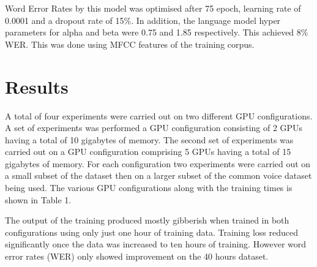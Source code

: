 Word Error Rates by this model was optimised after 75 epoch, learning rate of 0.0001 and a dropout rate of 15\%.  In addition, the language model hyper parameters for alpha and beta were 0.75 and 1.85 respectively.  This achieved 8\% WER. This was done using MFCC features of the training corpus.


\section{Results}
A total of four experiments were carried out on two different GPU configurations. A set of experiments was performed a GPU configuration consisting of 2 GPUs having a total of 10 gigabytes of memory. The second set of experiments was carried out on a GPU configuration comprising 5 GPUs having a total of 15 gigabytes of memory.  For each configuration two experiments were carried out on a small subset of the dataset then on a larger subset of the common voice dataset being used.   The various GPU configurations along with the training times is shown in Table 1.

The output of the training produced mostly gibberish when trained in both configurations using only just one hour of training data.  Training loss reduced significantly once the data was increased to ten hours of training.  However word error rates (WER) only showed improvement on the 40 hours dataset.


